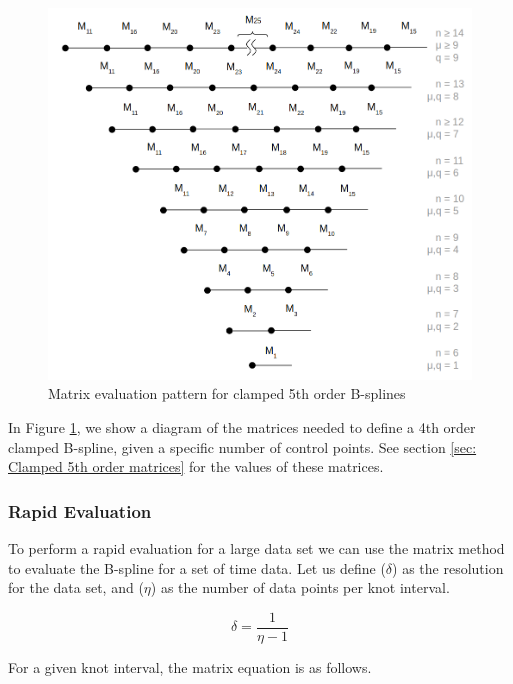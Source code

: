 \documentclass{article}
\begin{document}
\begin{figure}[H]
\begin{center}
\includegraphics[scale=.36]{Clamped5thOrderMatrixPattern.png}
\end{center}
\caption{Matrix evaluation pattern for clamped 5th order B-splines}
\label{Fig:Clamped 5th Order}
\end{figure}

    In Figure \ref{Fig:Clamped 5th Order}, we show a diagram of the matrices needed to define a 4th order clamped B-spline, given a specific number of control points. See section \ref{sec: Clamped 5th order matrices} for the values of these matrices.

\hspace{1cm}

\subsubsection{Rapid Evaluation}

To perform a rapid evaluation for a large data set we can use the matrix method to evaluate the B-spline for a set of time data. Let us define (\(\delta\)) as the resolution for the data set, and (\(\eta\)) as the number of data points per knot interval.

\begin{equation}
    \delta = \frac{1}{\eta-1}
\end{equation}

For a given knot interval, the matrix equation is as follows. 
\end{document}
